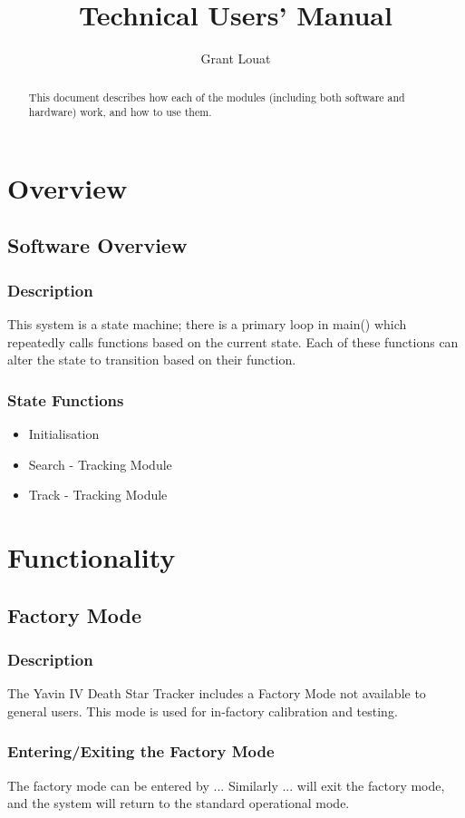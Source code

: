 \documentclass[]{report}
\title{Technical Users' Manual}
\author{Grant Louat}
\begin{document}
\maketitle

\begin{abstract}
	This document describes how each of the modules (including both software and hardware) work, and how to use them.
\end{abstract}

\part{Overview}
\chapter{Software Overview}
\section{Description}
This system is a state machine; there is a primary loop in main() which repeatedly calls functions based on the current state. Each of these functions can alter the state to transition based on their function.

\section{State Functions}
\begin{itemize}
	\item Initialisation
	\item Search - Tracking Module
	\item Track - Tracking Module
\end{itemize}

\part{Functionality}
\chapter{Factory Mode}
\section{Description}
The Yavin IV Death Star Tracker includes a Factory Mode not available to general users. This mode is used for in-factory calibration and testing.

\section{Entering/Exiting the Factory Mode}
The factory mode can be entered by ... Similarly ... will exit the factory mode, and the system will return to the standard operational mode.
\end{document}
